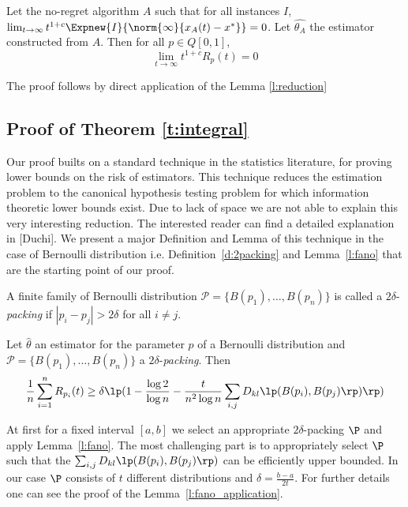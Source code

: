 \begin{theorem}
Let the no-regret algorithm $A$ such that for all instances $I$, $\lim_{t \rightarrow \infty} t^{1+c} \Expnew{I}{\norm{\infty}{x_A(t)-x^*}}=0$.
Let $\hat{\theta_A}$ the estimator constructed from $A$. Then for all  $p \in Q[0,1]$, \[\lim_{t \rightarrow \infty}t^{1+c}R_p(t)=0\]
\end{theorem}
The proof follows by direct application of the Lemma \ref{l:reduction}

\subsection{Proof of Theorem \ref{t:integral}}
Our proof builts on a standard technique in the statistics literature, for proving lower bounds on the risk of estimators.
This technique reduces the estimation problem to the canonical hypothesis testing problem for which information
theoretic lower bounds exist. Due to lack of space we are not able to explain this very interesting reduction. The
interested reader can find a detailed explanation in \cite{}[Duchi]. We present a major Definition and Lemma
of this technique in the case of Bernoulli distribution i.e. Definition~\ref{d:2packing} and Lemma~\ref{l:fano} that are
the starting point of our proof.

\begin{definition}\label{d:2packing}
A finite family of Bernoulli distribution $\mathcal{P}=\{B(p_1),\ldots,B(p_n)\}$ is called a $2\delta$-\emph{packing} if $|p_i-p_j|>2\delta$ for all $i \neq j$.
\end{definition}



\begin{lemma}\label{l:fano}
Let $\hat{\theta}$ an estimator for the parameter $p$ of a Bernoulli distribution and $\mathcal{P}=\{B(p_1),\ldots,B(p_n)\}$ a $2\delta$-\emph{packing}.
Then
\[\frac{1}{n} \sum_{i=1}^n R_{p_i}(t) \geq \delta \lp(1-\frac{\log 2}{\log n} - \frac{t}{n^2\log n}\sum_{i,j}D_{kl}\lp(B(p_i),B(p_j)\rp)\rp)\]%
\end{lemma}



\noindent At first for a fixed interval $[a,b]$ we select an appropriate $2\delta$-packing $\P$ and apply Lemma~\ref{l:fano}.
The most challenging part is to appropriately select $\P$ such that the $\sum_{i,j}D_{kl}\lp(B(p_i),B(p_j)\rp)$ can be
efficiently upper bounded. In our case $\P$ consists of $t$ different distributions and $\delta=\frac{b-a}{2t}$. For further details
one can see the proof of the Lemma~\ref{l:fano_application}.

